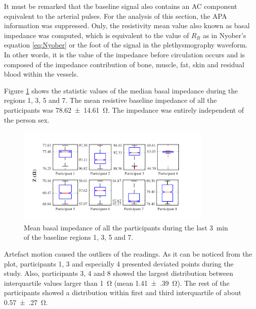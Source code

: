 It must be remarked that the baseline signal also contains an AC component equivalent to the arterial pulses. For the analysis of this section, the APA information was suppressed. Only, the resistivity mean value also known as basal impedance was computed, which is equivalent to the value of $R_B$ as in Nyober's equation \ref{eq:Nyober} or the foot of the signal in the plethysmography waveform. In other words, it is the value of the impedance before circulation occurs and is composed of the impedance contribution of bone, muscle, fat, skin and residual blood within the vessels. 

Figure \ref{fig:Basal statistics} shows the statistic values of the median basal impedance during the regions 1, 3, 5 and 7. The mean resistive baseline impedance of all the participants was \SI{78.62(1461)}{\ohm}. The impedance was entirely independent of the person sex.  

\begin{figure}[!htbp]
	\centering
	\includegraphics[width=0.85\textwidth,keepaspectratio]{figure_b_1}    
	\caption[Mean basal impedance boxplot]{Mean basal impedance of all the participants during the last \SI{3}{\minute} of the baseline regions 1, 3, 5 and 7.}
	\label{fig:Basal statistics} 
\end{figure}

Artefact motion caused the outliers of the readings. As it can be noticed from the plot, participants 1, 3 and especially 4 presented deviated points during the study. Also, participants 3, 4 and 8 showed the largest distribution between interquartile values larger than \SI{1}{\ohm} (mean \SI{1.41(39)}{\ohm}). The rest of the participants showed a distribution within first and third interquartile of about \SI{0.57(27)}{\ohm}. 

